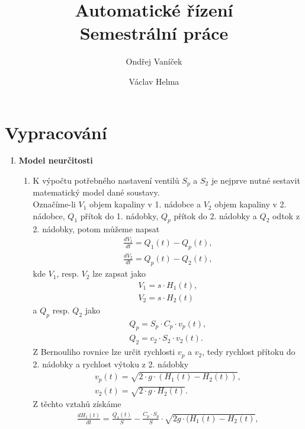 \documentclass[12pt,a4paper]{article}
\author{Ondřej Vaníček \and Václav Helma}
\title{Automatické řízení\\Semestrální práce}
\begin{document}
	\clearpage
	\thispagestyle{empty}
	\maketitle
	
	\newpage
	\pagestyle{plain}
	\setcounter{page}{1}
	\section*{Vypracování}
	\begin{enumerate}[I.]
		\item\textbf{Model neurčitosti}
		\begin{enumerate}[1.]
			\item K výpočtu potřebného nastavení ventilů $ S_p $ a $ S_2 $ je nejprve nutné sestavit matematický model dané soustavy.\\
			Označíme-li $ V_1 $ objem kapaliny v 1. nádobce a $ V_2 $ objem kapaliny v 2. nádobce, $ Q_1 $ přítok do 1. nádobky, $ Q_p $ přítok do 2. nádobky a $ Q_2 $ odtok z 2. nádobky, potom můžeme napsat
			\begin{gather*}
			\frac{dV_1}{dt} = Q_1(t) - Q_p(t) \label{dV1},\\
			\frac{dV_2}{dt} = Q_p(t) - Q_2(t) \label{dV2},
			\end{gather*}
			kde $ V_1 $, resp. $ V_2 $ lze zapsat jako
			\begin{gather*}
			V_1 = s \cdot H_1(t) \label{V1},\\
			V_2 = s \cdot H_2(t) \label{V2}
			\end{gather*}
			a $ Q_p $ resp. $ Q_2 $ jako
			\begin{gather*}
			Q_p = S_p \cdot C_p \cdot v_p(t) \label{Qp},\\
			Q_2 = c_2 \cdot S_2 \cdot v_2(t) \label{Q2}.
			\end{gather*}
			Z Bernouliho rovnice lze určit rychlosti $ v_p $ a $ v_2 $, tedy rychlost přítoku do 2. nádobky a rychlost výtoku z 2. nádobky
			\begin{gather*}
			v_p(t) = \sqrt{2\cdot g\cdot(H_1(t)-H_2(t))} \label{vp},\\
			v_2(t) = \sqrt{2\cdot g\cdot H_2(t)} \label{v2}.
			\end{gather*}
			Z těchto vztahů získáme
			\begin{gather}
			\frac{dH_1(t)}{dt} = \frac{Q_1(t)}{S} - \frac{C_p \cdot S_p}{S} 
			\cdot \sqrt{2g \cdot (H_1(t) - H_2(t)} \label{dH1},\\

\end{gather}
\end{enumerate}
\end{enumerate}
\end{document}
